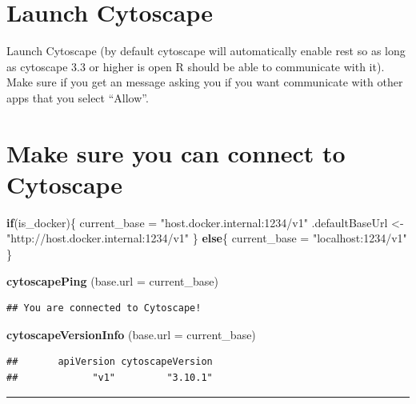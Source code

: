 \documentclass[
]{book}
\newenvironment{Shaded}{\begin{snugshade}}{\end{snugshade}}
\newcommand{\AttributeTok}[1]{\textcolor[rgb]{0.13,0.29,0.53}{#1}}
\newcommand{\ControlFlowTok}[1]{\textcolor[rgb]{0.13,0.29,0.53}{\textbf{#1}}}
\newcommand{\FunctionTok}[1]{\textcolor[rgb]{0.13,0.29,0.53}{\textbf{#1}}}
\newcommand{\NormalTok}[1]{#1}
\newcommand{\OtherTok}[1]{\textcolor[rgb]{0.56,0.35,0.01}{#1}}
\newcommand{\StringTok}[1]{\textcolor[rgb]{0.31,0.60,0.02}{#1}}
\begin{document}
\hypertarget{launch-cytoscape-1}{%
\section{Launch Cytoscape}\label{launch-cytoscape-1}}

Launch Cytoscape (by default cytoscape will automatically enable rest so as long as cytoscape 3.3 or higher is open R should be able to communicate with it). Make sure if you get an message asking you if you want communicate with other apps that you select ``Allow''.

\hypertarget{make-sure-you-can-connect-to-cytoscape-1}{%
\section{Make sure you can connect to Cytoscape}\label{make-sure-you-can-connect-to-cytoscape-1}}

\begin{Shaded}
\begin{Highlighting}[]
\ControlFlowTok{if}\NormalTok{(is\_docker)\{}
\NormalTok{  current\_base }\OtherTok{=} \StringTok{"host.docker.internal:1234/v1"}
\NormalTok{  .defaultBaseUrl }\OtherTok{\textless{}{-}} \StringTok{"http://host.docker.internal:1234/v1"}
\NormalTok{\} }\ControlFlowTok{else}\NormalTok{\{}
\NormalTok{  current\_base }\OtherTok{=} \StringTok{"localhost:1234/v1"}
\NormalTok{\}}

\FunctionTok{cytoscapePing}\NormalTok{ (}\AttributeTok{base.url =}\NormalTok{ current\_base)}
\end{Highlighting}
\end{Shaded}

\begin{verbatim}
## You are connected to Cytoscape!
\end{verbatim}

\begin{Shaded}
\begin{Highlighting}[]
\FunctionTok{cytoscapeVersionInfo}\NormalTok{ (}\AttributeTok{base.url =}\NormalTok{ current\_base)}
\end{Highlighting}
\end{Shaded}

\begin{verbatim}
##       apiVersion cytoscapeVersion 
##             "v1"         "3.10.1"
\end{verbatim}

\begin{center}\rule{0.5\linewidth}{0.5pt}\end{center}
\end{document}
